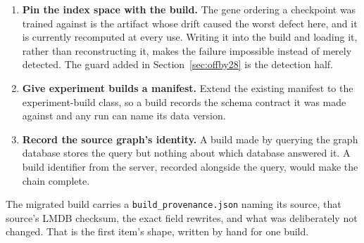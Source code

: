 \begin{enumerate}
\item \textbf{Pin the index space with the build.} The gene ordering a
  checkpoint was trained against is the artifact whose drift caused the worst
  defect here, and it is currently recomputed at every use. Writing it into the
  build and loading it, rather than reconstructing it, makes the failure
  impossible instead of merely detected. The guard added in
  Section~\ref{sec:offby28} is the detection half.
\item \textbf{Give experiment builds a manifest.} Extend the existing manifest to
  the experiment-build class, so a build records the schema contract it was made
  against and any run can name its data version.
\item \textbf{Record the source graph's identity.} A build made by querying the
  graph database stores the query but nothing about which database answered it.
  A build identifier from the server, recorded alongside the query, would make
  the chain complete.
\end{enumerate}

The migrated build carries a \texttt{build\_provenance.json} naming its source,
that source's LMDB checksum, the exact field rewrites, and what was deliberately
not changed. That is the first item's shape, written by hand for one build.
